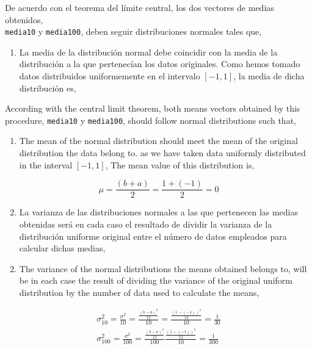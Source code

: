 \begin{paracol}{2}
De acuerdo con el teorema del límite central, los dos vectores de medias obtenidos,\\ \texttt{media10} y \texttt{media100}, deben seguir distribuciones normales tales que,
\begin{enumerate}
\item La media de la distribución normal debe coincidir con la media de la distribución a la que pertenecían los datos originales. Como hemos tomado datos distribuidos uniformemente en el intervalo $[-1,1]$, la media de dicha distribución es,
\end{enumerate}
\switchcolumn
According with the central limit theorem, both means vectors obtained by this procedure,  \texttt{media10} y \texttt{media100}, should follow normal distributions such that, 
\begin{enumerate}
	\item The mean of the normal distribution sho\-uld meet the mean of the original distribution the data belong to. as we have taken data uniformly distributed in the interval $[-1,1]$, The mean value of this distribution is,
\end{enumerate}

\end{paracol}
\begin{equation*}
\mu = \frac{(b+a)}{2}=\frac{1+(-1)}{2}=0
\end{equation*}
\begin{paracol}{2}
\begin{enumerate}
\setcounter{enumi}{1}
\item La varianza de las distribuciones normales a las que pertenecen las medias obtenidas será en cada caso el resultado de dividir la varianza de la distribución uniforme original entre el número de datos empleados para calcular dichas medias,
\end{enumerate}
\switchcolumn
\begin{enumerate}
	\setcounter{enumi}{1}
	\item The variance of the normal distributions the means obtained belongs to, will be in each case the result of dividing the variance of the original uniform distribution by the number of data used to calculate the means, 
\end{enumerate}
\end{paracol}

\begin{align*}
\sigma_{10}^2 = \frac{\sigma^2}{10}=\frac{\frac{(b-a)^2}{12}}{10}=\frac{\frac{(1-(-1))^2}{12}}{10}=\frac{1}{30}\\
\sigma_{100}^2 = \frac{\sigma^2}{100}=\frac{\frac{(b-a)^2}{12}}{100}\frac{\frac{(1-(-1))^2}{12}}{10}=\frac{1}{300}
\end{align*}

